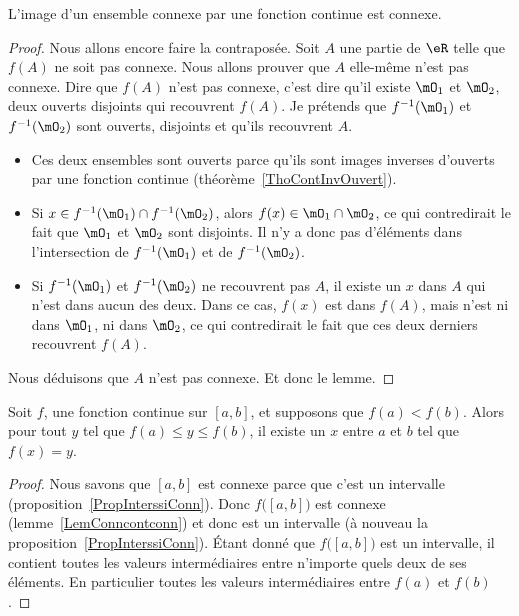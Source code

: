 \begin{lemma}   \label{LemConncontconn}
L'image d'un ensemble connexe par une fonction continue est connexe.
\end{lemma}

\begin{proof}
Nous allons encore faire la contraposée. Soit $A$ une partie de $\eR$ telle que $f(A)$ ne soit pas connexe. Nous allons prouver que $A$ elle-même n'est pas connexe. Dire que $f(A)$ n'est pas connexe, c'est dire qu'il existe $\mO_1$ et $\mO_2$, deux ouverts disjoints qui recouvrent $f(A)$. Je prétends que $f^{-1}(\mO_1)$ et $f^{-1}(\mO_2)$ sont ouverts, disjoints et qu'ils recouvrent $A$.
\begin{itemize}
\item Ces deux ensembles sont ouverts parce qu'ils sont images inverses d'ouverts par une fonction continue (théorème~\ref{ThoContInvOuvert}).
\item Si $x\in f^{-1}(\mO_1)\cap f^{-1}(\mO_2)$, alors $f(x)\in \mO_1\cap\mO_2$, ce qui contredirait le fait que $\mO_1$ et $\mO_2$ sont disjoints. Il n'y a donc pas d'éléments dans l'intersection de $f^{-1}(\mO_1)$ et de $f^{-1}(\mO_2)$.
\item Si $f^{-1}(\mO_1)$ et $f^{-1}(\mO_2)$ ne recouvrent pas $A$, il existe un $x$ dans $A$ qui n'est dans aucun des deux. Dans ce cas, $f(x)$ est dans $f(A)$, mais n'est ni dans $\mO_1$, ni dans $\mO_2$, ce qui contredirait le fait que ces deux derniers recouvrent $f(A)$.
\end{itemize}
Nous déduisons que $A$ n'est pas connexe. Et donc le lemme.
\end{proof}

\begin{theorem}        \label{ThoValInter}
Soit $f$, une fonction continue sur $[a,b]$, et supposons que $f(a)<f(b)$. Alors pour tout $y$ tel que $f(a)\leq y\leq f(b)$, il existe un $x$ entre $a$ et $b$ tel que $f(x)=y$.
\end{theorem}

\begin{proof}
Nous savons que $[a,b]$ est connexe parce que c'est un intervalle (proposition~\ref{PropInterssiConn}). Donc $f\big( [a,b] \big)$ est connexe (lemme~\ref{LemConncontconn}) et donc est un intervalle (à nouveau la proposition~\ref{PropInterssiConn}). Étant donné que $f\big( [a,b] \big)$ est un intervalle, il contient toutes les valeurs intermédiaires entre n'importe quels deux de ses éléments. En particulier toutes les valeurs intermédiaires entre $f(a)$ et $f(b)$.
\end{proof}

